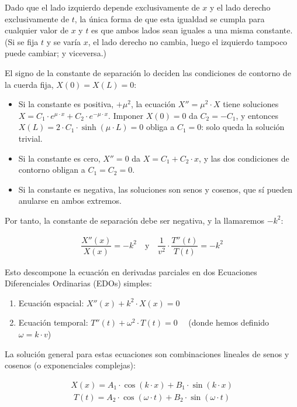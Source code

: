 \documentclass[
  spanish,
]{article}
\providecommand{\tightlist}{%
  \setlength{\itemsep}{0pt}\setlength{\parskip}{0pt}}
\begin{document}
Dado que el lado izquierdo depende exclusivamente de \(x\) y el lado
derecho exclusivamente de \(t\), la única forma de que esta igualdad se
cumpla para cualquier valor de \(x\) y \(t\) es que ambos lados sean
iguales a una misma constante. (Si se fija \(t\) y se varía \(x\), el
lado derecho no cambia, luego el izquierdo tampoco puede cambiar; y
viceversa.)

El signo de la constante de separación lo deciden las condiciones de
contorno de la cuerda fija, \(X(0) = X(L) = 0\):

\begin{itemize}
\tightlist
\item
  Si la constante es positiva, \(+\mu^2\), la ecuación
  \(X'' = \mu^2 \cdot X\) tiene soluciones
  \(X = C_1 \cdot e^{\mu \cdot x} + C_2 \cdot e^{-\mu \cdot x}\).
  Imponer \(X(0)=0\) da \(C_2 = -C_1\), y entonces
  \(X(L) = 2 \cdot C_1 \cdot \sinh(\mu \cdot L) = 0\) obliga a
  \(C_1 = 0\): solo queda la solución trivial.
\item
  Si la constante es cero, \(X'' = 0\) da \(X = C_1 + C_2 \cdot x\), y
  las dos condiciones de contorno obligan a \(C_1 = C_2 = 0\).
\item
  Si la constante es negativa, las soluciones son senos y cosenos, que
  sí pueden anularse en ambos extremos.
\end{itemize}

Por tanto, la constante de separación debe ser negativa, y la llamaremos
\(-k^2\):

\[
\begin{aligned}
\dfrac{X''(x)}{X(x)} = -k^2 \quad \text{y} \quad \dfrac{1}{v^2} \cdot \dfrac{T''(t)}{T(t)} = -k^2
\end{aligned}
\]

Esto descompone la ecuación en derivadas parciales en dos Ecuaciones
Diferenciales Ordinarias (EDOs) simples:

\begin{enumerate}
\def\labelenumi{\arabic{enumi}.}
\tightlist
\item
  Ecuación espacial: \(X''(x) + k^2 \cdot X(x) = 0\)
\item
  Ecuación temporal: \(T''(t) + \omega^2 \cdot T(t) = 0 \quad\) (donde
  hemos definido \(\omega = k \cdot v\))
\end{enumerate}

La solución general para estas ecuaciones son combinaciones lineales de
senos y cosenos (o exponenciales complejas):

\[
\begin{aligned}
X(x) = A_1 \cdot \cos(k \cdot x) + B_1 \cdot \sin(k \cdot x)
\end{aligned}
\] \[
\begin{aligned}
T(t) = A_2 \cdot \cos(\omega \cdot t) + B_2 \cdot \sin(\omega \cdot t)
\end{aligned}
\]
\end{document}
